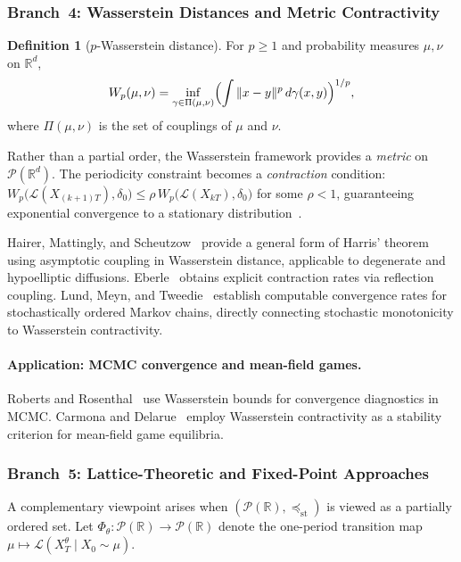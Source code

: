 \documentclass[11pt,a4paper]{article}
\theoremstyle{plain}
\theoremstyle{definition}
\newtheorem{definition}[theorem]{Definition}
\theoremstyle{remark}
\begin{document}
\subsubsection{Branch~4: Wasserstein Distances and Metric Contractivity}
\label{sec:macro:wass}

\begin{definition}[$p$-Wasserstein distance]
\label{def:wass}
For $p \ge 1$ and probability measures $\mu, \nu$ on $\mathbb{R}^d$,
\[
  W_p(\mu, \nu) = \inf_{\gamma \in \Pi(\mu,\nu)}
  \Bigl(\int \|x-y\|^p\,d\gamma(x,y)\Bigr)^{1/p},
\]
where $\Pi(\mu,\nu)$ is the set of couplings of $\mu$ and $\nu$.
\end{definition}

Rather than a partial order, the Wasserstein framework provides a
\emph{metric} on $\mathcal{P}(\mathbb{R}^d)$.  The periodicity
constraint becomes a \emph{contraction} condition:
$W_p\!\bigl(\mathcal{L}(X_{(k+1)T}), \delta_0\bigr) \le
\rho\, W_p\!\bigl(\mathcal{L}(X_{kT}), \delta_0\bigr)$ for some
$\rho < 1$, guaranteeing exponential convergence to a stationary
distribution~\cite{villani2009}.

Hairer, Mattingly, and Scheutzow~\cite{hairer2011} provide a general
form of Harris' theorem using asymptotic coupling in Wasserstein
distance, applicable to degenerate and hypoelliptic diffusions.
Eberle~\cite{eberle2016} obtains explicit contraction rates via
reflection coupling.  Lund, Meyn, and Tweedie~\cite{lund1996}
establish computable convergence rates for stochastically ordered Markov
chains, directly connecting stochastic monotonicity to Wasserstein
contractivity.

\paragraph{Application: MCMC convergence and mean-field games.}
Roberts and Rosenthal~\cite{roberts2004} use Wasserstein bounds for
convergence diagnostics in MCMC.  Carmona and
Delarue~\cite{carmona2018} employ Wasserstein contractivity as a
stability criterion for mean-field game equilibria.

\subsubsection{Branch~5: Lattice-Theoretic and Fixed-Point Approaches}
\label{sec:macro:lattice}

A complementary viewpoint arises when
$(\mathcal{P}(\mathbb{R}), \preceq_{\mathrm{st}})$ is viewed as a
partially ordered set.  Let $\Phi_\theta : \mathcal{P}(\mathbb{R}) \to
\mathcal{P}(\mathbb{R})$ denote the one-period transition map
$\mu \mapsto \mathcal{L}(X_T^\theta \mid X_0 \sim \mu)$.
\end{document}
